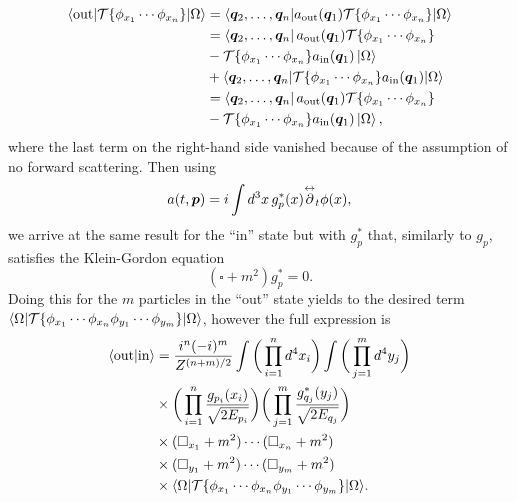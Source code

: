 \begin{equation}
    \begin{split}
        \langle \mathrm{out} | \mathcal{T}{\{\phi_{x_1}\cdots\phi_{x_n}\}} | \Omega \rangle &= \langle \bm{q}_2,\dots,\bm{q}_n | a_{\mathrm{out}}(\bm{q}_1)\mathcal{T}{\{\phi_{x_1}\cdots\phi_{x_n}\}} | \Omega \rangle \\
        &= \bra{\bm{q}_2,\dots,\bm{q}_n}a_{\mathrm{out}}(\bm{q}_1)\mathcal{T}{\{\phi_{x_1}\cdots\phi_{x_n}\}} \\
        & - \mathcal{T}{\{\phi_{x_1}\cdots\phi_{x_n}\}}a_{\mathrm{in}}(\bm{q}_1)\ket{\Omega} \\
        &+ \langle \bm{q}_2,\dots,\bm{q}_n | \mathcal{T}{\{\phi_{x_1}\cdots\phi_{x_n}\}}a_{\mathrm{in}}(\bm{q}_1) | \Omega \rangle \\
        &= \bra{\bm{q}_2,\dots,\bm{q}_n}a_{\mathrm{out}}(\bm{q}_1)\mathcal{T}{\{\phi_{x_1}\cdots\phi_{x_n}\}} \\
        & - \mathcal{T}{\{\phi_{x_1}\cdots\phi_{x_n}\}}a_{\mathrm{in}}(\bm{q}_1)\ket{\Omega},
    \end{split}
\end{equation}
where the last term on the right-hand side vanished because of the assumption of no forward scattering. Then using 
\begin{equation}
    a(t,\bm{p}) = i\int d^3x\,g_p^*(x)\overset{\leftrightarrow}{\partial}_t\phi(x),
\end{equation}
we arrive at the same result for the ``in'' state but with $g_p^*$ that, similarly to $g_p$, satisfies the Klein-Gordon equation
\begin{equation}
    (\square + m^2)g_p^* = 0.
\end{equation}
Doing this for the $m$ particles in the ``out'' state yields to the desired term $\langle \Omega | \mathcal{T}{\{\phi_{x_1}\cdots\phi_{x_n}\phi_{y_1}\cdots\phi_{y_m}\}} | \Omega \rangle$, however the full expression is 
\begin{equation}
    \begin{split}
        \langle \mathrm{out} | \mathrm{in} \rangle &= \frac{i^{n}(-i)^m}{Z^{(n + m)/2}}\int\bigg(\prod_{i=1}^n d^4x_i\bigg)\int\bigg(\prod_{j=1}^m d^4y_j\bigg) \\
        &\times \bigg(\prod_{i=1}^n \frac{g_{p_i}(x_i)}{\sqrt{2E_{p_i}}}\bigg)\bigg(\prod_{j=1}^m \frac{g_{q_j}^*(y_j)}{\sqrt{2E_{q_j}}}\bigg) \\
        &\times (\square_{x_1} + m^2)\cdots(\square_{x_n} + m^2) \\
        &\times (\square_{y_1} + m^2)\cdots(\square_{y_m} + m^2) \\
        &\times \langle \Omega | \mathcal{T}{\{\phi_{x_1}\cdots\phi_{x_n}\phi_{y_1}\cdots\phi_{y_m}\}} | \Omega \rangle.
    \end{split}
\end{equation}
